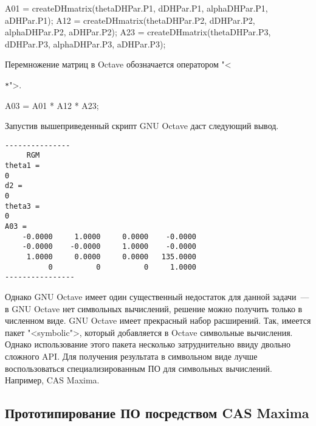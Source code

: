 \documentclass[oneside, final, 14pt]{extarticle}
\begin{document}
{\small \begin{listing}{32}
A01 = createDHmatrix(thetaDHPar.P1, dDHPar.P1, alphaDHPar.P1, aDHPar.P1);
A12 = createDHmatrix(thetaDHPar.P2, dDHPar.P2, alphaDHPar.P2, aDHPar.P2);
A23 = createDHmatrix(thetaDHPar.P3, dDHPar.P3, alphaDHPar.P3, aDHPar.P3);
\end{listing} 
}
\par
Перемножение матриц в Octave обозначается оператором "<{\verb|*|">.

{\small \begin{listing}{35}
A03 = A01 * A12 * A23;
\end{listing} 
}
\par

Запустив вышеприведенный скрипт GNU Octave даст следующий вывод.

\begin{minipage}{1\textwidth}
{\small
\begin{verbatim}
---------------
     RGM
theta1 =
0
d2 =
0
theta3 =
0
A03 =
    -0.0000     1.0000     0.0000    -0.0000
    -0.0000    -0.0000     1.0000    -0.0000
     1.0000     0.0000     0.0000   135.0000
          0          0          0     1.0000
----------------
\end{verbatim} 
}
\end{minipage}
\par

Однако GNU Octave имеет один существенный недостаток для данной задачи~--- в GNU Octave нет символьных вычислений, решение можно получить только в численном виде.
GNU Octave имеет прекрасный набор расширений.
Так, имеется пакет "<{\ttfamily symbolic}">, который добавляется в Octave символьные вычисления.
Однако использование этого пакета несколько затруднительно ввиду двольно сложного API.
Для получения результата в символьном виде лучше воспользоваться специализированным ПО для символьных вычислений.
Например, CAS Maxima.

\subsection{Прототипирование ПО посредством CAS Maxima}
\label{s:prot_maxima}

}
\end{document}
